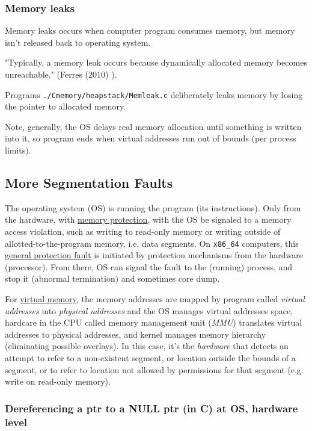 \documentclass[10pt]{amsart}
\begin{document}
\begin{multicols*}{2}
\subsubsection{Memory leaks}  

Memory leaks occurs when computer program consumes memory, but memory isn't released back to operating system.  

"Typically, a memory leak occurs because dynamically allocated memory becomes unreachable."  (Ferres (2010) \cite{Ferr2010}).  

Programs \verb|./Cmemory/heapstack/Memleak.c| deliberately leaks memory by losing the pointer to allocated memory.  

Note, generally, the OS delays real memory allocation until something is written into it, so program ends when virtual addresses run out of bounds (per process limits).  

\subsection{More Segmentation Faults}  

The operating system (OS) is running the program (its instructions).  Only from the hardware, with \href{https://en.wikipedia.org/wiki/Memory_protection}{memory protection}, with the OS be signaled to a memory access violation, such as writing to read-only memory or writing outside of allotted-to-the-program memory, i.e. data segments.  On \verb|x86_64| computers, this \href{https://en.wikipedia.org/wiki/General_protection_fault}{general protection fault} is initiated by protection mechanisms from the hardware (processor).  From there, OS can signal the fault to the (running) process, and stop it (abnormal termination) and sometimes core dump. 

For \href{https://en.wikipedia.org/wiki/Virtual_memory}{virtual memory}, the memory addresses are mapped by program called \emph{virtual addresses} into \emph{physical addresses} and the OS manages virtual addresses space, hardcare in the CPU called memory management unit (\emph{MMU}) translates virtual addresses to physical addresses, and kernel manages memory hierarchy (eliminating possible overlays).  In this case, it's the \emph{hardware} that detects an attempt to refer to a non-existent segment, or location outside the bounds of a segment, or to refer to location not allowed by permissions for that segment (e.g. write on read-only memory).          

\subsubsection{Dereferencing a ptr to a NULL ptr (in C) at OS, hardware level}


\end{multicols*}
\end{document}
